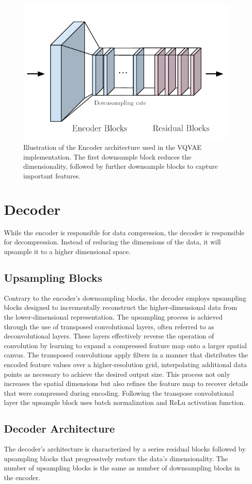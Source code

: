 \begin{figure}[H]
    \includegraphics[scale=0.8]{figures/figure-pdf/Encoder.pdf}
    \caption{Illustration of the Encoder architecture used in the VQVAE implementation. The first downsample block reduces the dimensionality, followed by further downsample blocks to capture important features.}
\end{figure}

\section{Decoder}
While the encoder is responsible for data compression, the decoder is responsible for decompression. Instead of reducing the dimensions of the data, it will upsample it to a higher dimensional space.

\subsection{Upsampling Blocks}
Contrary to the encoder's downsampling blocks, the decoder employs upsampling blocks designed to incrementally reconstruct the higher-dimensional data from the lower-dimensional representation.  
The upsampling process is achieved through the use of transposed convolutional layers, often referred to as deconvolutional layers. These layers effectively reverse the operation of convolution by learning to expand a compressed feature map onto a larger spatial canvas.
The transposed convolutions apply filters in a manner that distributes the encoded feature values over a higher-resolution grid, interpolating additional data points as necessary to achieve the desired output size.
This process not only increases the spatial dimensions but also refines the feature map to recover details that were compressed during encoding.
Following the transpose convolutional layer the upsample block uses batch normalization and ReLu activation function.


\subsection{Decoder Architecture}
The decoder's architecture is characterized by a series residual blocks followed by upsampling blocks that progressively restore the data's dimensionality. The number of upsampling blocks is the same as number of downsampling blocks in the encoder. 
